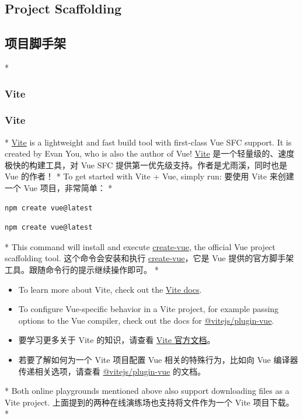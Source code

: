 \begin{paracol}{2}
\subsection{Project Scaffolding}
\switchcolumn
\subsection{项目脚手架}
\switchcolumn[0]*%
\subsubsection{Vite}
\switchcolumn
\subsubsection{Vite}
\switchcolumn[0]*%
\href{https://vitejs.dev/}{Vite} is a lightweight and fast build tool
with first-class Vue SFC support. It is created by Evan You, who is also
the author of Vue!
\switchcolumn
\href{https://cn.vitejs.dev/}{Vite}
是一个轻量级的、速度极快的构建工具，对 Vue SFC
提供第一优先级支持。作者是尤雨溪，同时也是 Vue 的作者！
\switchcolumn[0]*%
To get started with Vite + Vue, simply run:
\switchcolumn
要使用 Vite 来创建一个 Vue 项目，非常简单：
\switchcolumn[0]*%
\begin{verbatim}
npm create vue@latest
\end{verbatim}
\switchcolumn
\begin{verbatim}
npm create vue@latest
\end{verbatim}
\switchcolumn[0]*%
This command will install and execute
\href{https://github.com/vuejs/create-vue}{create-vue}, the official Vue
project scaffolding tool.
\switchcolumn
这个命令会安装和执行
\href{https://github.com/vuejs/create-vue}{create-vue}，它是 Vue
提供的官方脚手架工具。跟随命令行的提示继续操作即可。
\switchcolumn[0]*%
\begin{itemize}
\item
  To learn more about Vite, check out the
  \href{https://vitejs.dev/}{Vite docs}.
\item
  To configure Vue-specific behavior in a Vite project, for example
  passing options to the Vue compiler, check out the docs for
  \href{https://github.com/vitejs/vite-plugin-vue/tree/main/packages/plugin-vue\#readme}{@vitejs/plugin-vue}.
\end{itemize}
\switchcolumn
\begin{itemize}
\item
  要学习更多关于 Vite 的知识，请查看 \href{https://cn.vitejs.dev/}{Vite
  官方文档}。
\item
  若要了解如何为一个 Vite 项目配置 Vue 相关的特殊行为，比如向 Vue
  编译器传递相关选项，请查看
  \href{https://github.com/vitejs/vite-plugin-vue/tree/main/packages/plugin-vue\#readme}{@vitejs/plugin-vue}
  的文档。
\end{itemize}
\switchcolumn[0]*%
Both online playgrounds mentioned above also support downloading files
as a Vite project.
\switchcolumn
上面提到的两种在线演练场也支持将文件作为一个 Vite 项目下载。
\switchcolumn[0]*%

\end{paracol}
